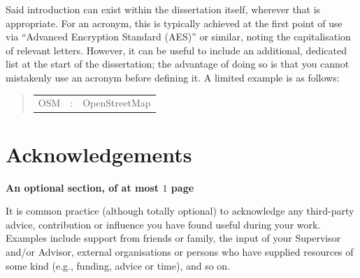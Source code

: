\documentclass[ draft,
                    author={Alexander Hill},
                supervisor={Dr. Benjamin Sach},
                    degree={MEng},
                     title={MARMOSET: Multi Agent Real-time Multi-core Online
                     Simulation for Efficient Transportation},
                  subtitle={},
                      type={research},
                      year={2016} ]{dissertation}
\begin{document}
Said introduction can exist within the dissertation itself, wherever
that is appropriate.  For an acronym, this is typically achieved at
the first point of use via ``Advanced Encryption Standard (AES)'' or
similar, noting the capitalisation of relevant letters.  However, it
can be useful to include an additional, dedicated list at the start
of the dissertation; the advantage of doing so is that you cannot
mistakenly use an acronym before defining it.  A limited example is
as follows:

\begin{quote}
\noindent
\begin{tabular}{lcl}
OSM                 &:     & OpenStreetMap \\
\end{tabular}
\end{quote}


\chapter*{Acknowledgements}

{\bf An optional section, of at most $1$ page}
\vspace{1cm}


\noindent
It is common practice (although totally optional) to acknowledge any
third-party advice, contribution or influence you have found useful
during your work.  Examples include support from friends or family,
the input of your Supervisor and/or Advisor, external organisations
or persons who  have supplied resources of some kind (e.g., funding,
advice or time), and so on.


%
\end{document}
